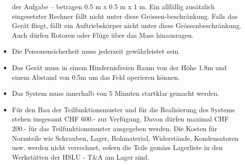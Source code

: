 \documentclass[a4paper,10pt,fleqn]{article}
\begin{document}
\begin{itemize}
        der Aufgabe – betragen 0.5 m x 0.5 m x 1 m. Ein allfällig zusätzlich 
        eingesetzter Rechner fällt nicht unter diese Grössen-beschränkung. 
        Falls das Gerät fliegt, fällt ein Auftriebskörper nicht unter diese 
        Grössenbeschränkung. Auch dürfen Rotoren oder Flüge über das Mass 
        hinausragen. 
    \item Die Personensicherheit muss jederzeit gewährleistet sein. 
    \item Das Gerät muss in einem Hindernisfreien Raum von der Höhe 1.8m und 
        einem Abstand von 0.5m um das Feld operieren können.
    \item Das System muss innerhalb von 5 Minuten startklar gemacht werden.
    \item Für den Bau der Teilfunktionsmuster und für die Realisierung des 
        Systems stehen insgesamt CHF 600.- zur Verfügung. Davon dürfen maximal 
        CHF 200.- für das Teilfunktionsmuster ausgegeben werden.  Die Kosten 
        für Normteile wie Schrauben, Lager, Rohmaterial, Widerstände, 
        Kondensatoren usw. werden nicht verrechnet, sofern die Teile gemäss 
        Lagerliste in den Werkstätten der HSLU - T\&A am Lager sind.
\end{itemize}
\end{document}
